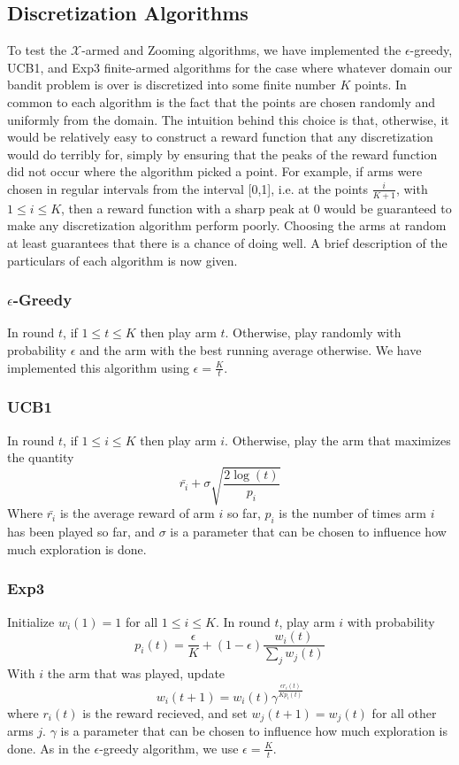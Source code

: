 \subsection{Discretization Algorithms}
To test the $\mathcal{X}$-armed and Zooming algorithms, we have implemented
the $\epsilon$-greedy, UCB1, and Exp3 finite-armed algorithms for
the case where whatever domain our bandit problem is over is discretized
into some finite number $K$ points.  In common to each algorithm is the
fact that the points are chosen randomly and uniformly from the domain.  The
intuition behind this choice is that, otherwise, it would be relatively easy
to construct a reward function that any discretization would do terribly
for, simply by ensuring that the peaks of the reward function did not occur
where the algorithm picked a point.  For example, if arms were chosen in
regular intervals from the interval [0,1], i.e. at the points 
$\frac{i}{K+1}$, with $1 \leq i \leq K$, then a reward function with a
sharp peak at 0 would be guaranteed to make any discretization algorithm
perform poorly.  Choosing the arms at random at least guarantees that there
is a chance of doing well.  A brief description of the particulars of 
each algorithm is now given.

\subsubsection{$\epsilon$-Greedy}
In round $t$, if $1 \leq t \leq K$ then play arm $t$.  Otherwise, play
randomly with probability $\epsilon$ and the arm with the best running
average otherwise.  We have implemented this algorithm using
$\epsilon = \frac{K}{t}$.

\subsubsection{UCB1}
In round $t$, if $1 \leq i \leq K$ then play arm $i$.  Otherwise, play
the arm that maximizes the quantity
\[
	\bar{r_i} + \sigma \sqrt{\frac{2 \log(t)}{p_i}}
\]
Where $\bar{r_i}$ is the average reward of arm $i$ so far, $p_i$ is the 
number of times arm $i$ has been played so far, and $\sigma$ is a parameter
that can be chosen to influence how much exploration is done.

\subsubsection{Exp3}
Initialize $w_i(1) = 1$ for all $1 \leq i \leq K$.  In round $t$, play
arm $i$ with probability
\[
	p_i(t) = \frac{\epsilon}{K} + (1 - \epsilon) \frac{w_i(t)}{\sum_j w_j(t)}
\]
With $i$ the arm that was played, update
\[
	w_i(t+1) = w_i(t)\gamma^{\frac{\epsilon r_i(t)}{K p_i(t)}}
\]
where $r_i(t)$ is the reward recieved, and set $w_j(t+1) = w_j(t)$ for all
other arms $j$.  $\gamma$ is a parameter that can be chosen to influence how
much exploration is done.  As in the $\epsilon$-greedy algorithm, we use
$\epsilon = \frac{K}{t}$.
